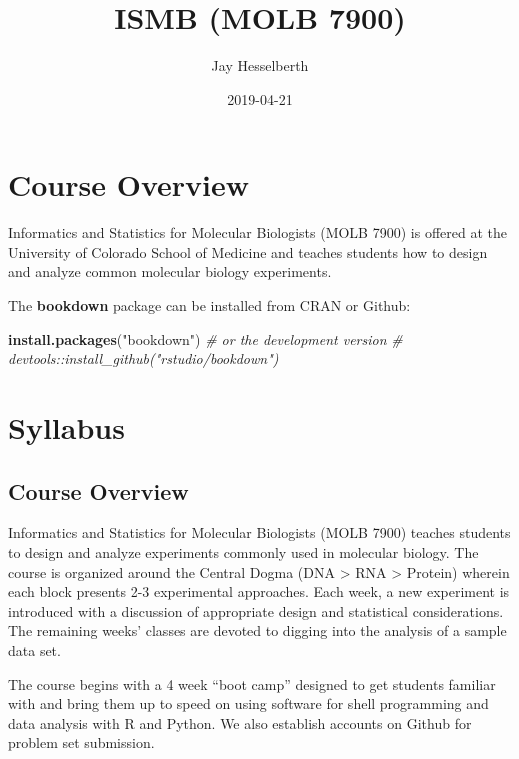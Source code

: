 \documentclass[]{book}
\title{ISMB (MOLB 7900)}
\author{Jay Hesselberth}
\date{2019-04-21}
\newenvironment{Shaded}{\begin{snugshade}}{\end{snugshade}}
\newcommand{\CommentTok}[1]{\textcolor[rgb]{0.56,0.35,0.01}{\textit{#1}}}
\newcommand{\KeywordTok}[1]{\textcolor[rgb]{0.13,0.29,0.53}{\textbf{#1}}}
\newcommand{\NormalTok}[1]{#1}
\newcommand{\StringTok}[1]{\textcolor[rgb]{0.31,0.60,0.02}{#1}}
\begin{document}
\maketitle

{
\setcounter{tocdepth}{1}
\tableofcontents
}
\hypertarget{course-overview}{%
\chapter*{Course Overview}\label{course-overview}}

Informatics and Statistics for Molecular Biologists (MOLB 7900) is offered at the University of Colorado School of Medicine and teaches students how to design and analyze common molecular biology experiments.

The \textbf{bookdown} package can be installed from CRAN or Github:

\begin{Shaded}
\begin{Highlighting}[]
\KeywordTok{install.packages}\NormalTok{(}\StringTok{"bookdown"}\NormalTok{)}
\CommentTok{# or the development version}
\CommentTok{# devtools::install_github("rstudio/bookdown")}
\end{Highlighting}
\end{Shaded}

\hypertarget{syllabus}{%
\chapter*{Syllabus}\label{syllabus}}

\hypertarget{course-overview-1}{%
\section{Course Overview}\label{course-overview-1}}

Informatics and Statistics for Molecular Biologists (MOLB 7900) teaches students to design and analyze experiments commonly used in molecular biology. The course is organized around the Central Dogma (DNA \textgreater{} RNA \textgreater{} Protein) wherein each block presents 2-3 experimental approaches. Each week, a new experiment is introduced with a discussion of appropriate design and statistical considerations. The remaining weeks' classes are devoted to digging into the analysis of a sample data set.

The course begins with a 4 week ``boot camp'' designed to get students familiar with and bring them up to speed on using software for shell programming and data analysis with R and Python. We also establish accounts on Github for problem set submission.
\end{document}
